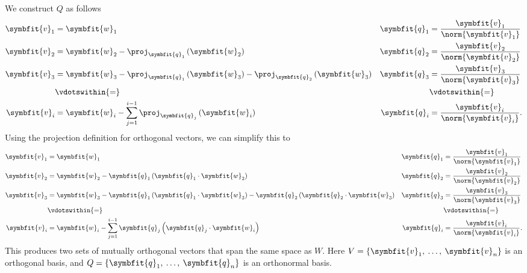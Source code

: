 \documentclass{article}
\begin{document}
We construct \(Q\) as follows
\begin{align*}
    \symbfit{v}_1 & = \symbfit{w}_1                                                                                                           & \symbfit{q}_1 & = \frac{\symbfit{v}_1}{\norm{\symbfit{v}_1}}  \\
    \symbfit{v}_2 & = \symbfit{w}_2 - \proj_{\symbfit{q}_1} \left( \symbfit{w}_2 \right)                                                      & \symbfit{q}_2 & = \frac{\symbfit{v}_2}{\norm{\symbfit{v}_2}}  \\
    \symbfit{v}_3 & = \symbfit{w}_3 - \proj_{\symbfit{q}_1} \left( \symbfit{w}_3 \right) - \proj_{\symbfit{q}_2} \left( \symbfit{w}_3 \right) & \symbfit{q}_3 & = \frac{\symbfit{v}_3}{\norm{\symbfit{v}_3}}  \\
                  & \vdotswithin{=}                                                                                                           &               & \vdotswithin{=}                               \\
    \symbfit{v}_i & = \symbfit{w}_i - \sum_{j = 1}^{i - 1} \proj_{\symbfit{q}_j} \left( \symbfit{w}_i \right)                                 & \symbfit{q}_i & = \frac{\symbfit{v}_i}{\norm{\symbfit{v}_i}}.
\end{align*}
Using the projection definition for orthogonal vectors, we can simplify this to
\begin{align*}
    \symbfit{v}_1 & = \symbfit{w}_1                                                                                                                                   & \symbfit{q}_1 & = \frac{\symbfit{v}_1}{\norm{\symbfit{v}_1}}  \\
    \symbfit{v}_2 & = \symbfit{w}_2 - \symbfit{q}_1 \left( \symbfit{q}_1 \cdot \symbfit{w}_2 \right)                                                                  & \symbfit{q}_2 & = \frac{\symbfit{v}_2}{\norm{\symbfit{v}_2}}  \\
    \symbfit{v}_3 & = \symbfit{w}_3 - \symbfit{q}_1 \left( \symbfit{q}_1 \cdot \symbfit{w}_3 \right) - \symbfit{q}_2 \left( \symbfit{q}_2 \cdot \symbfit{w}_3 \right) & \symbfit{q}_3 & = \frac{\symbfit{v}_3}{\norm{\symbfit{v}_3}}  \\
                  & \vdotswithin{=}                                                                                                                                   &               & \vdotswithin{=}                               \\
    \symbfit{v}_i & = \symbfit{w}_i - \sum_{j = 1}^{i - 1} \symbfit{q}_j \left( \symbfit{q}_j \cdot \symbfit{w}_i \right)                                             & \symbfit{q}_i & = \frac{\symbfit{v}_i}{\norm{\symbfit{v}_i}}.
\end{align*}
This produces two sets of mutually orthogonal vectors that span the same space as \(W\). Here \(V = \left\{ \symbfit{v}_1,\: \dots,\: \symbfit{v}_n \right\}\) is an orthogonal basis,
and \(Q = \left\{ \symbfit{q}_1,\: \dots,\: \symbfit{q}_n \right\}\) is an orthonormal basis.
\end{document}
